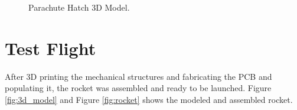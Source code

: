 \documentclass{workreport}
\begin{document}
\begin{body}
	\begin{figure}[!tbp]
	\centering
	\hfill
	\caption{Parachute Hatch 3D Model.}
	\end{figure}

	\section{Test Flight}

	After 3D printing the mechanical structures and fabricating the PCB and populating it, the rocket was assembled and ready to be launched. Figure \ref{fig:3d_model} and Figure \ref{fig:rocket} shows the modeled and assembled rocket.


\end{body}
\end{document}
